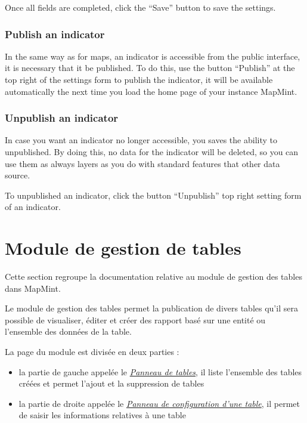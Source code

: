 \documentclass[letterpaper,10pt,english]{sphinxmanual}
\begin{document}
Once all fields are completed, click the ``Save'' button to save the settings.


\subsection{Publish an indicator}
\label{indicators/indicatorspanel:publier-un-indicateur}
In the same way as for maps, an indicator is accessible from the public interface, it is necessary that it be published. To do this, use the button ``Publish'' at the top right of the settings form to publish the indicator, it will be available automatically the next time you load the home page of your instance MapMint.


\subsection{Unpublish an indicator}
\label{indicators/indicatorspanel:depublier-un-indicateur}
In case you want an indicator no longer accessible, you saves the ability to unpublished. By doing this, no data for the indicator will be deleted, so you can use them as always layers as you do with standard features that other data source.

To unpublished an indicator, click the button ``Unpublish'' top right setting form of an indicator.


\chapter{Module de gestion de tables}
\label{tables/index:tables}\label{tables/index::doc}\label{tables/index:module-de-gestion-de-tables}
Cette section regroupe la documentation relative au module de gestion
des tables dans MapMint.

Le module de gestion des tables permet la publication de divers tables
qu'il sera possible de visualiser, éditer et créer des rapport basé
sur une entité ou l'ensemble des données de la table.

La page du module est divisée en deux parties :
\begin{itemize}
\item {} 
la partie de gauche appelée le {\hyperref[tables/tbllist::doc]{\emph{\emph{Panneau de tables}}}}, il liste l'ensemble des tables créées et permet l'ajout et la suppression de tables

\item {} 
la partie de droite appelée le {\hyperref[tables/infopanel::doc]{\emph{\emph{Panneau de configuration d'une table}}}}, il permet de saisir les informations relatives à une table

\end{itemize}
\end{document}
